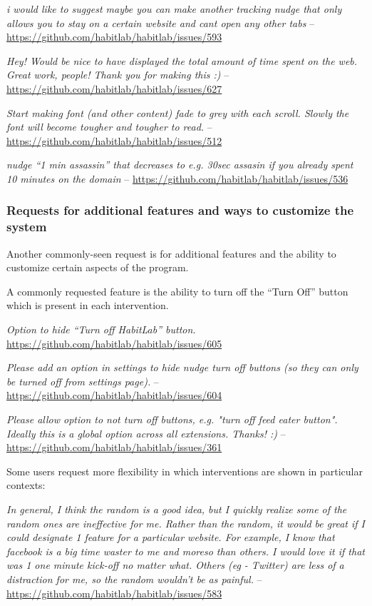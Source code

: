 \textit{i would like to suggest maybe you can make another tracking nudge that only allows you to stay on a certain website and cant open any other tabs} -- \url{https://github.com/habitlab/habitlab/issues/593}

\textit{Hey! Would be nice to have displayed the total amount of time spent on the web. Great work, people! Thank you for making this :)} -- \url{https://github.com/habitlab/habitlab/issues/627}

\textit{Start making font (and other content) fade to grey with each scroll. Slowly the font will become tougher and tougher to read.} -- \url{https://github.com/habitlab/habitlab/issues/512}

\textit{nudge ``1 min assassin'' that decreases to e.g. 30sec assasin if you already spent 10 minutes on the domain} -- \url{https://github.com/habitlab/habitlab/issues/536}

\subsubsection{Requests for additional features and ways to customize the system}

Another commonly-seen request is for additional features and the ability to customize certain aspects of the program.

A commonly requested feature is the ability to turn off the ``Turn Off'' button which is present in each intervention.

\textit{Option to hide ``Turn off HabitLab'' button.} \url{https://github.com/habitlab/habitlab/issues/605}

\textit{Please add an option in settings to hide nudge turn off buttons (so they can only be turned off from settings page).} -- \url{https://github.com/habitlab/habitlab/issues/604}

\textit{Please allow option to not turn off buttons, e.g. "turn off feed eater button". Ideally this is a global option across all extensions. Thanks! :)} -- \url{https://github.com/habitlab/habitlab/issues/361}

Some users request more flexibility in which interventions are shown in particular contexts:

\textit{In general, I think the random is a good idea, but I quickly realize some of the random ones are ineffective for me. Rather than the random, it would be great if I could designate 1 feature for a particular website. For example, I know that facebook is a big time waster to me and moreso than others. I would love it if that was 1 one minute kick-off no matter what. Others (eg - Twitter) are less of a distraction for me, so the random wouldn't be as painful.} -- \url{https://github.com/habitlab/habitlab/issues/583}

